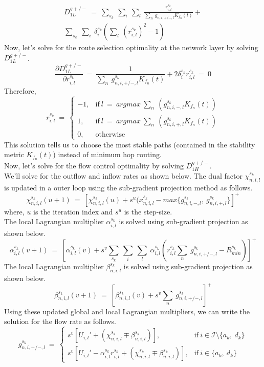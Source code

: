 \documentclass[12pt, draftcls, onecolumn]{IEEEtran}
\begin{document}
\begin{equation}
    \begin{aligned}
        D_{1L}^{g+/-}\ =\ \sum_{s_k}\ \sum_{i}\ \sum_{l}\ \frac{r_{i,l}^{s_k}}{\sum_{n}\ g_{n,i,+/-,l} K_{f_n}(t)} + \\\sum_{s_k}\ \sum_{i}\ \delta_i^{s_k}(\sum_l\ (r_{i,l}^{s_k})^2 - 1)
    \end{aligned}
\end{equation}
Now, let's solve for the route selection optimality at the network layer by solving $D_{1L}^{g+/-}$.
\[\frac{\partial D_{1L}^{g+/-}}{\partial r_{i,l}^{s_k}}\ =\ \frac{1}{\sum_{n}\ g_{n,i,+/-,l}^{s_k} K_{f_n}(t)} + 2\delta_i^{s_k} r_{i,l}^{s_k}\ =\ 0\]
Therefore,
\begin{equation*}
    r_{i,l}^{s_k}\ =\ 
    \begin{cases}
        -1, & \text{if}\ l\ =\ argmax\ \sum_n\ (g_{n,i,-,l}^{s_k} K_{f_n}(t))\\
        1, & \text{if}\ l\ =\ argmax\ \sum_n\ (g_{n,i,+,l}^{s_k} K_{f_n}(t))\\
        0, & \text{otherwise}
    \end{cases}
\end{equation*}
This solution tells us to choose the most stable paths (contained in the stability metric $K_{f_n}(t)$) instead of minimum hop routing.
\\Now, let's solve for the flow control optimality by solving $D_{1H}^{g+/-}$.
\\We'll solve for the outflow and inflow rates as shown below.
The dual factor $\chi_{n,i,l}^{s_k}$ is updated in a outer loop using the sub-gradient projection method as follows.
\[\chi_{n,i,l}^{s_k}(u+1)\ =\ [\chi_{n,i,l}^{s_k}(u) + s^u(x_{n,i,l}^{s_k} - max\{g_{n,i,-,l}^{s_k},\ g_{n,i,+,l}^{s_k}\}]^+\]
where, $u$ is the iteration index and $s^u$ is the step-size.
\\The local Lagrangian multiplier $\alpha_{i,l}^{s_k}$ is solved using sub-gradient projection as shown below.
\[\alpha_{i,l}^{s_k}(v+1)\ =\ [\alpha_{i,l}^{s_k}(v) + s^v \sum_{s_k}\ \sum_{i}\ \sum_{l}\ \alpha_{i,l}^{s_k}(r_{i,l}^{s_k}\sum_n\ g_{n,i,+/-,l}^{s_k} - R_{min}^{s_k})]^+\]
The local Lagrangian multiplier $\beta_{n,i,l}^{s_k}$ is solved using sub-gradient projection as shown below.
\[\beta_{n,i,l}^{s_k}(v+1)\ =\ [\beta_{n,i,l}^{s_k}(v) + s^v \sum_n\ g_{n,i,+/-,l}^{s_k}]^+\]
Using these updated global and local Lagrangian multipliers, we can write the solution for the flow rate as follows.
\begin{equation*}
    g_{n,i,+/-,l}^{s_k}\ =\ 
    \begin{cases}
        s^v[U_{i,l}' + (\chi_{n,i,l}^{s_k} \mp \beta_{n,i,l}^{s_k})], & \text{if}\ i \in \mathcal{I}\setminus\{a_k,\ d_k\}\\
        s^v[U_{i,l}' - \alpha_{i,l}^{s_k} r_{i,l}^{s_k} + (\chi_{n,i,l}^{s_k} \mp \beta_{n,i,l}^{s_k})], & \text{if}\ i \in \{a_k,\ d_k\}
    \end{cases}
\end{equation*}
\end{document}

